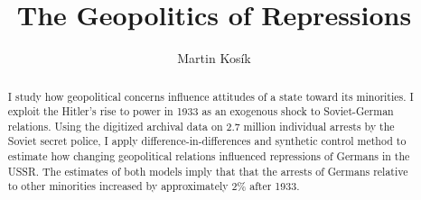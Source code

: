 \newcommand{\noop}[1]{} 



\title{The Geopolitics of Repressions}
\author{Martin Kosík}



\maketitle

\begin{abstract}
  I study how geopolitical concerns influence attitudes of a state toward its minorities. I exploit the  Hitler's rise to power in 1933 as an exogenous shock to Soviet-German relations. 
    Using the digitized archival data on 2.7 million individual arrests by the Soviet secret police, I apply difference-in-differences and synthetic control method to estimate how changing geopolitical relations influenced repressions of Germans in the USSR. The estimates of both models imply that that the arrests of Germans relative to other minorities increased by approximately 2\% after 1933. 
\end{abstract}

\newpage
 \tableofcontents
\newpage
{}


